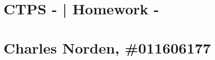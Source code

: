 \documentclass[12pt,letterpaper]{article}
\begin{document}
\section*{ CTPS - | Homework - }
\section*{ Charles Norden, \#011606177 }

\section*{}
\pagebreak

\section*{}
\pagebreak
\end{document}
